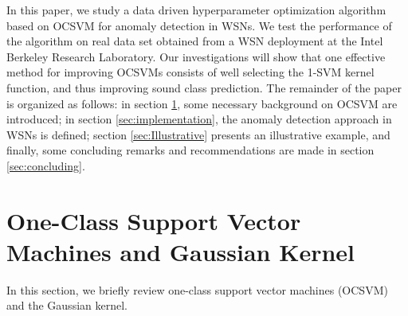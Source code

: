 \documentclass[conference]{IEEEtran}
\begin{document}
In this paper, we study a data driven hyperparameter optimization algorithm based on OCSVM for anomaly detection in WSNs. 
We test the performance of the algorithm on real data set obtained from a WSN deployment at the Intel Berkeley 
Research Laboratory. Our investigations will show that one effective method for improving  OCSVMs  consists  of  well  selecting  the  1-SVM
kernel function, and thus improving sound class prediction. The remainder of the paper is organized as follows: 
in section \ref{sec:OCSVM}, some necessary background on OCSVM are introduced; in section \ref{sec:implementation}, the anomaly detection approach in WSNs is defined; section \ref{sec:Illustrative} presents an illustrative example, and finally, some concluding remarks and recommendations are made in section \ref{sec:concluding}.

\section{One-Class Support Vector Machines and Gaussian Kernel}\label{sec:OCSVM}

In this section, we briefly review one-class support vector machines (OCSVM) \cite{scholkopf2001estimating} and the Gaussian kernel.
\end{document}
